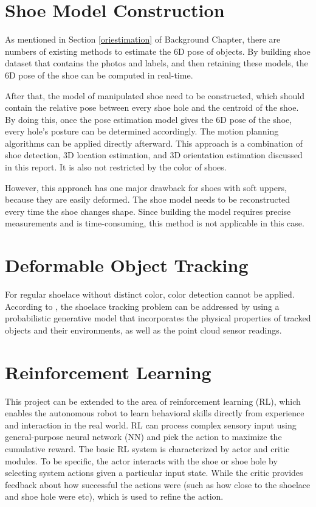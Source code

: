 \section{Shoe Model Construction}
As mentioned in Section \ref{oriestimation} of Background Chapter, there are numbers of existing methods to estimate the 6D pose of objects. By building shoe dataset that contains the photos and labels, and then retaining these models, the 6D pose of the shoe can be computed in real-time. 

After that, the model of manipulated shoe need to be constructed, which should contain the relative pose between every shoe hole and the centroid of the shoe. By doing this, once the pose estimation model gives the 6D pose of the shoe, every hole's posture can be determined accordingly. The motion planning algorithms can be applied directly afterward. This approach is a combination of shoe detection, 3D location estimation, and 3D orientation estimation discussed in this report. It is also not restricted by the color of shoes. 

However, this approach has one major drawback for shoes with soft uppers, because they are easily deformed. The shoe model needs to be reconstructed every time the shoe changes shape. Since building the model requires precise measurements and is time-consuming, this method is not applicable in this case.

\section{Deformable Object Tracking}
For regular shoelace without distinct color, color detection cannot be applied. According to \citep{deformable_track}, the shoelace tracking problem can be addressed by using a probabilistic generative model that incorporates the physical properties of tracked objects and their environments, as well as the point cloud sensor readings. 

\section{Reinforcement Learning}
This project can be extended to the area of reinforcement learning (RL), which enables the autonomous robot to learn behavioral skills directly from experience and interaction in the real world. RL can process complex sensory input using general-purpose neural network (NN) and pick the action to maximize the cumulative reward. The basic RL system is characterized by actor and critic modules. To be specific, the actor interacts with the shoe or shoe hole by selecting system actions given a particular input state. While the critic provides feedback about how successful the actions were (such as how close to the shoelace and shoe hole were etc), which is used to refine the action.

